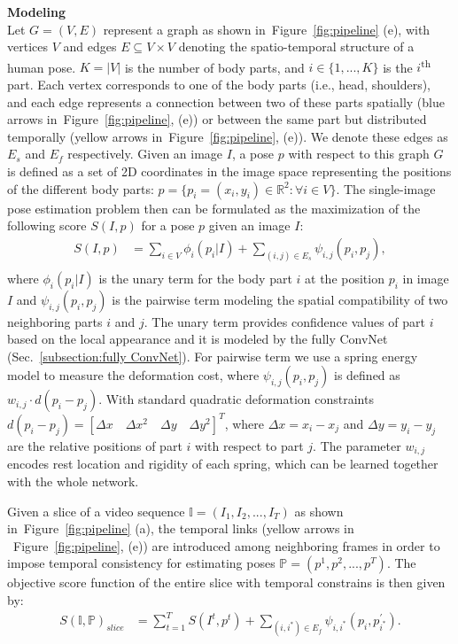 \documentclass[10pt,twocolumn,letterpaper]{article}
\newcommand{\figref}[1]{Figure~\ref{#1}}
\newcommand{\secref}[1]{Sec.~\ref{#1}}
\begin{document}
\noindent\textbf{Modeling}\\
Let $G = (V,E)$ represent a graph as shown in~\figref{fig:pipeline} (e), with vertices $V$ and edges $E \subseteq  V \times V$ denoting the spatio-temporal structure of a human pose. $K = |V|$ is the number of body parts, and $i \in \{1,...,K\}$ is the $i$\textsuperscript{th} part. Each vertex corresponds to one of the body parts (i.e., head, shoulders), and each edge represents a connection between two of these parts spatially (blue arrows in~\figref{fig:pipeline}, (e)) or between the same part but distributed temporally (yellow arrows in~\figref{fig:pipeline}, (e)). We denote these edges as $E_s$ and $E_f$ respectively. Given an image $I$, a pose $p$ with respect to this graph $G$ is defined as a set of 2D coordinates in the image space representing the positions of the different body parts: $p = \{p_i = (x_i,y_i) \in  \mathbb{R}^2 : \forall i \in V\}$.
The single-image pose estimation problem then can be formulated
as the maximization of the following score $S(I,p)$ for a pose $p$ given an image $I$:
\begin{equation}
\begin{aligned}\label{equation:scorePose}
S(I,p) &= \sum_{i \in V}\phi_{i}(p_i| I) + \sum_{(i,j)\in E_s} \psi_{i,j}(p_i, p_j),\\
\end{aligned}
\end{equation}
where $\phi_{i}(p_i| I)$ is the unary term for the body part $i$ at
the position $p_i$ in image $I$ and $\psi_{i,j}(p_i, p_j)$ is the pairwise term modeling the spatial compatibility of two neighboring parts $i$ and $j$. The unary term provides confidence values of part $i$ based on the local appearance and it is modeled by the fully ConvNet (\secref{subsection:fully ConvNet}). For pairwise term we use a spring energy model to measure the deformation cost, where $\psi_{i,j}(p_i, p_j)$ is defined as $w_{i,j}\cdot d(p_i-p_j)$. With standard quadratic deformation constraints $d(p_i-p_j) = [\Delta x \quad \Delta x^2 \quad \Delta y \quad \Delta y^2]^T$, where $\Delta x = x_i - x_j$ and $\Delta y = y_i - y_j$ are the relative positions of part $i$ with respect to part $j$. The parameter $w_{i,j}$ encodes rest location and rigidity of each spring, which can be learned together with the whole network.

Given a slice of a video sequence $\mathbb{I} = (I_1,I_2,...,I_T)$ as shown in~\figref{fig:pipeline} (a), the temporal links (yellow arrows in ~\figref{fig:pipeline}, (e)) are introduced among neighboring frames in order to impose temporal consistency for estimating poses $\mathbb{P} = (p^1,p^2,...,p^T)$. The objective score function of the entire slice with temporal constrains is then given by:
\begin{equation}
\begin{aligned}
S(\mathbb{I,P})_{slice} &= \sum_{t=1}^{T}S(I^t,p^t)+\sum_{(i,i^{\ast}) \in E_f}\psi_{i,i^{\ast}}(p_{i}, p^{\prime}_{i^{\ast}}).\\
\end{aligned}
\label{equation:scoreSlice}
\end{equation}
\end{document}
